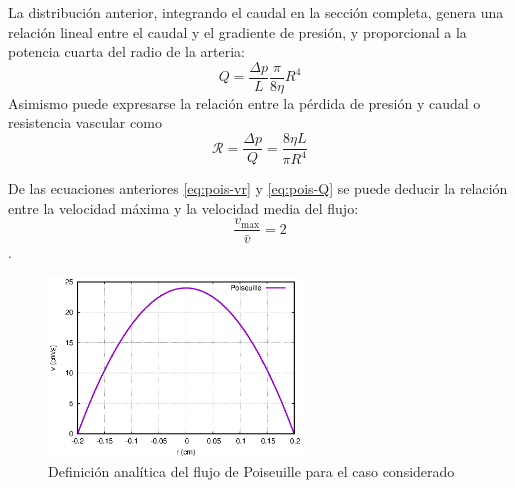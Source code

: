 La distribución anterior, integrando el caudal en la sección completa, genera una relación lineal entre el caudal y el gradiente de presión, y proporcional a la potencia cuarta del radio de la arteria:
\begin{equation}
	Q = \frac{\Delta p}{L}\frac{\pi}{8\eta} R^{4}
	\label{eq:pois-Q}
\end{equation}
Asimismo puede expresarse la relación entre la pérdida de presión y caudal o resistencia vascular como
\begin{equation}
	\mathcal{R} = \frac{\Delta p}{Q} = \frac{8\eta L}{\pi R^{4}}
\end{equation}

De las ecuaciones anteriores \eqref{eq:pois-vr} y \eqref{eq:pois-Q} se puede deducir la relación entre la velocidad máxima y la velocidad media del flujo:
\begin{equation}
	\frac{v_\text{max}}{\bar v} = 2
\end{equation}.

\begin{figure}[!htp]
\centering
\includegraphics[width=0.6\textwidth]{figuras_4/pois.eps}
\caption{Definición analítica del flujo de Poiseuille para el caso considerado}
\label{fig:pois}
\end{figure}
